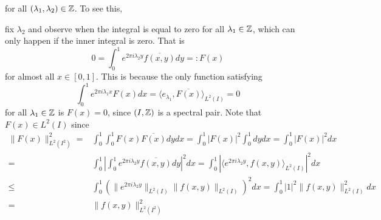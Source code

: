 \documentclass[../thesis.tex]{subfiles}
\begin{document}
for all $(\lambda_1,\lambda_2) \in \mathbb{Z}$. To see this, 


fix $\lambda_2$ and observe when the integral is equal to zero for all $\lambda_1\in \mathbb{Z}$, which can only happen if the inner integral is zero. That is 
\begin{equation*}
    0=\int_0^1 e^{2 \pi i \lambda_2 y} \overline{f(x,y)} dy  =: F(x)
\end{equation*}
for almost all $x\in[0,1]$. This is because the only function satisfying 
\begin{equation*}
    \int_0^1 e^{2 \pi i \lambda_1 x} F(x)dx = \langle e_{\lambda_1}, \overline{F(x)}\rangle_{L^2(I)} = 0
\end{equation*}
for all $\lambda_1 \in \mathbb{Z}$ is $F(x)=0$, since $(I,\mathbb{Z})$ is a spectral pair. Note that $F(x)\in L^2(I)$ since
\begin{align*}
    \|F(x)\|_{L^2(I^2)}^2 =&  \int_0^1 \int_0^1 F(x) \overline{F(x)} dydx
    = \int_0^1 | F(x)|^2 \int_0^1 dy dx = \int_0^1 | F(x)|^2 dx\\
    =& \int_0^1 \left| \int_0^1 e^{2 \pi i \lambda_2 y} \overline{f(x,y)} dy \right|^2 dx 
    = \int_0^1 \left| \langle e^{2 \pi i \lambda_2 y} , f(x,y) \rangle_{L^2(I)} \right|^2 dx\\
    \leq & \int_0^1 \left( \|e^{2 \pi i \lambda_2 y} \|_{L^2(I)} \|f(x,y) \|_{L^2(I)} \right)^2dx
    = \int_0^1 | 1|^2 \|f(x,y) \|_{L^2(I)}^2 dx\\
    = & \|f(x,y) \|_{L^2(I^2)}^2
\end{align*}



\end{document}

